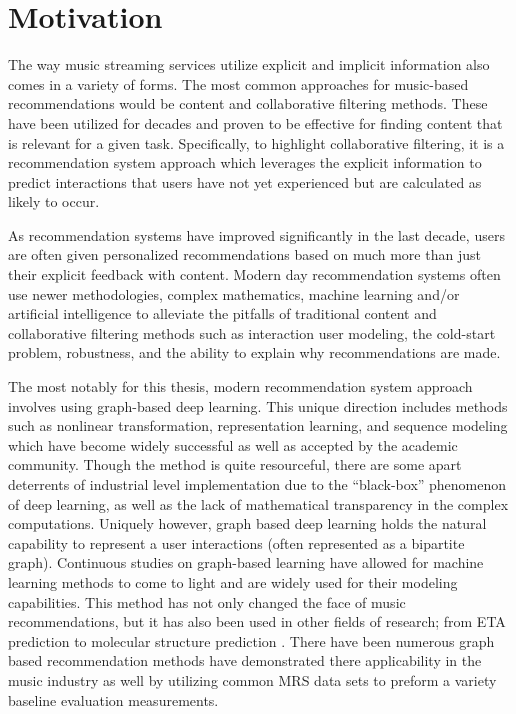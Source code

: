 \section{Motivation}
The way music streaming services utilize explicit and implicit information also comes in a variety of forms. The most common approaches for music-based recommendations would be content and collaborative filtering methods. These have been utilized for decades and proven to be effective for finding content that is relevant for a given task. Specifically, to highlight collaborative filtering, it is a recommendation system approach which leverages the explicit information to predict interactions that users have not yet experienced but are calculated as likely to occur.

As recommendation systems have improved significantly in the last decade, users are often given personalized recommendations based on much more than just their explicit feedback with content. Modern day recommendation systems often use newer methodologies, complex mathematics, machine learning and/or artificial intelligence to alleviate the pitfalls of traditional content and collaborative filtering methods such as interaction user modeling, the cold-start problem, robustness, and the ability to explain why recommendations are made. \cite{Zhang2022}

The most notably for this thesis, modern recommendation system approach involves using graph-based deep learning. This unique direction includes methods such as nonlinear transformation, representation learning, and sequence modeling which have become widely successful as well as accepted by the academic community. \cite{Zhang2022} Though the method is quite resourceful, there are some apart deterrents of industrial level implementation due to the “black-box” phenomenon of deep learning, as well as the lack of mathematical transparency in the complex computations. \cite{Zhang2022} Uniquely however, graph based deep learning holds the natural capability to represent a user interactions (often represented as a bipartite graph). Continuous studies on graph-based learning have allowed for machine learning methods to come to light and are widely used for their modeling capabilities. \cite{Gao22} This method has not only changed the face of music recommendations, but it has also been used in other fields of research; from ETA prediction \cite{derrow2021eta} to molecular structure prediction \cite{li2009automated}. There have been numerous graph based recommendation methods have demonstrated there applicability in the music industry as well by utilizing common MRS data sets to preform a variety baseline evaluation measurements.\cite{li2020quaternion}\cite{fan2020relation}\cite{he2020mining}

